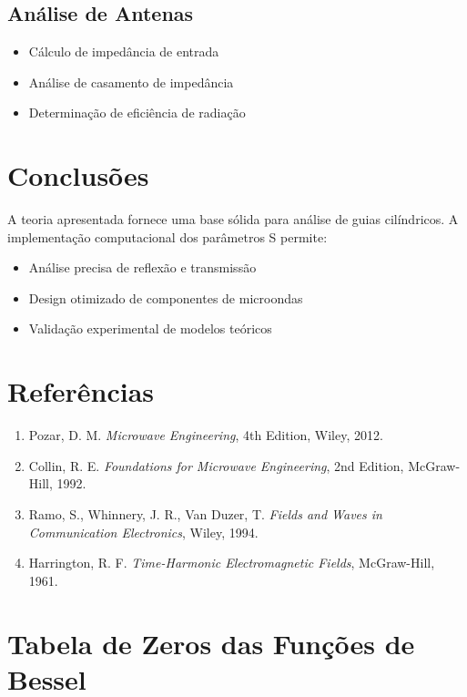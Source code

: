 \documentclass[a4paper,12pt]{article}
\begin{document}
\subsection{Análise de Antenas}
\begin{itemize}
    \item Cálculo de impedância de entrada
    \item Análise de casamento de impedância
    \item Determinação de eficiência de radiação
\end{itemize}

\section{Conclusões}

A teoria apresentada fornece uma base sólida para análise de guias cilíndricos. A implementação computacional dos parâmetros S permite:

\begin{itemize}
    \item Análise precisa de reflexão e transmissão
    \item Design otimizado de componentes de microondas
    \item Validação experimental de modelos teóricos
\end{itemize}

\section{Referências}

\begin{enumerate}
    \item Pozar, D. M. \textit{Microwave Engineering}, 4th Edition, Wiley, 2012.
    \item Collin, R. E. \textit{Foundations for Microwave Engineering}, 2nd Edition, McGraw-Hill, 1992.
    \item Ramo, S., Whinnery, J. R., Van Duzer, T. \textit{Fields and Waves in Communication Electronics}, Wiley, 1994.
    \item Harrington, R. F. \textit{Time-Harmonic Electromagnetic Fields}, McGraw-Hill, 1961.
\end{enumerate}

\appendix

\section{Tabela de Zeros das Funções de Bessel}
\end{document}
